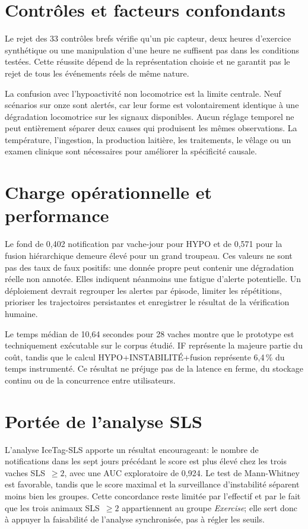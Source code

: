\section{Contrôles et facteurs confondants}

Le rejet des 33 contrôles brefs vérifie qu'un pic capteur, deux heures d'exercice synthétique
ou une manipulation d'une heure ne suffisent pas dans les conditions testées. Cette réussite
dépend de la représentation choisie et ne garantit pas le rejet de tous les événements réels
de même nature.

La confusion avec l'hypoactivité non locomotrice est la limite centrale. Neuf scénarios sur
onze sont alertés, car leur forme est volontairement identique à une dégradation locomotrice
sur les signaux disponibles. Aucun réglage temporel ne peut entièrement séparer deux causes
qui produisent les mêmes observations. La température, l'ingestion, la production laitière,
les traitements, le vêlage ou un examen clinique sont nécessaires pour améliorer la
spécificité causale.

\section{Charge opérationnelle et performance}

Le fond de 0,402 notification par vache-jour pour HYPO et de 0,571 pour la fusion
hiérarchique demeure élevé pour un grand troupeau. Ces valeurs ne sont pas des taux de faux
positifs: une donnée propre peut contenir une dégradation réelle non annotée. Elles indiquent
néanmoins une fatigue d'alerte potentielle. Un déploiement devrait regrouper les alertes par
épisode, limiter les répétitions, prioriser les trajectoires persistantes et enregistrer le
résultat de la vérification humaine.

Le temps médian de 10,64 secondes pour 28 vaches montre que le prototype est techniquement
exécutable sur le corpus étudié. IF représente la majeure partie du coût, tandis que le calcul
HYPO+INSTABILITÉ+fusion représente 6,4\,\% du temps instrumenté. Ce résultat ne préjuge pas de
la latence en ferme, du stockage continu ou de la concurrence entre utilisateurs.

\section{Portée de l'analyse SLS}

L'analyse IceTag-SLS apporte un résultat encourageant: le nombre de notifications dans les
sept jours précédant le score est plus élevé chez les trois vaches SLS~$\geq2$, avec une AUC
exploratoire de 0,924. Le test de Mann-Whitney est favorable, tandis que le score maximal et
la surveillance d'instabilité séparent moins bien les groupes. Cette concordance reste
limitée par l'effectif et par le fait que les trois animaux SLS~$\geq2$ appartiennent au
groupe \textit{Exercise}; elle sert donc à appuyer la faisabilité de l'analyse synchronisée,
pas à régler les seuils.

